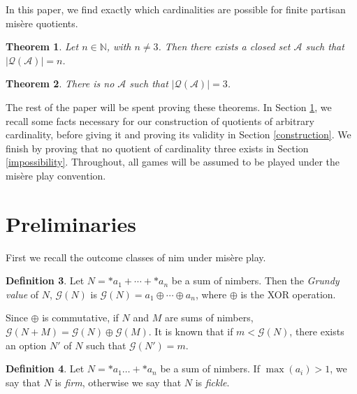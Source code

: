 \documentclass{amsart}
\theoremstyle{plain}
\newtheorem{thm}{Theorem}
\theoremstyle{definition}
\newtheorem{defn}[thm]{Definition}
\theoremstyle{remark}
\numberwithin{equation}{section}
\numberwithin{thm}{section}
\begin{document}
In this paper, we find exactly which cardinalities are possible for finite partisan mis\`ere quotients. 
\begin{thm}
    \label{main}
    Let $n \in \mathbb{N}$, with $n \neq 3$. Then there exists a closed set $\mathscr{A}$ such that $|\mathcal{Q}(\mathscr{A})| = n$.
\end{thm}
\begin{thm}
   \label{main2}
    There is no $\mathscr{A}$ such that $|\mathcal{Q}(\mathscr{A})| = 3$.
\end{thm}
The rest of the paper will be spent proving these theorems. In Section \ref{prelims}, we recall some facts necessary for our construction of quotients of arbitrary cardinality, before giving it and proving its validity in Section \ref{construction}. We finish by proving that no quotient of cardinality three exists in Section \ref{impossibility}.
Throughout, all games will be assumed to be played under the mis\`ere play convention.
\section{Preliminaries}
\label{prelims}

First we recall the outcome classes of nim under mis\`ere play.
\begin{defn}
    Let $N = *a_1 + \cdots +  *a_n $ be a sum of nimbers. Then the \emph{Grundy value} of $N$, $\mathcal{G}(N)$ is $\mathcal{G}(N) = a_1 \oplus \cdots \oplus a_n $, where $\oplus$ is the XOR operation.
\end{defn}
Since $\oplus$ is commutative, if $N$ and $M$ are sums of nimbers, $\mathcal{G}(N+M) = \mathcal{G}(N) \oplus \mathcal{G}(M)$. It is known that if $m < \mathcal{G}(N)$, there exists an option $N'$ of $N$ such that $\mathcal{G}(N') = m$.
\begin{defn}
    Let $N = *a_1 \dots + *a_n$ be a sum of nimbers. If $\max (a_i) > 1$, we say that $N$ is \emph{firm}, otherwise we say that $N$ is \emph{fickle}.
\end{defn}
\end{document}
